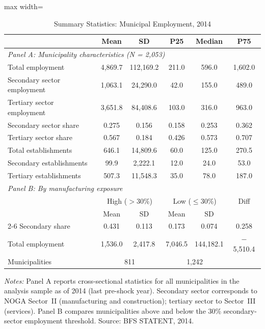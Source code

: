 \begin{table}[htbp]
\centering
\caption{Summary Statistics: Municipal Employment, 2014}
\label{tab:summary}
\begin{threeparttable}
\begin{adjustbox}{max width=\textwidth}
\begin{tabular}{lccccc}
\hline\hline
 & Mean & SD & P25 & Median & P75 \\
\hline
\multicolumn{6}{l}{\textit{Panel A: Municipality characteristics (N = 2,053)}} \\[3pt]
Total employment & 4,869.7 & 112,169.2 & 211.0 & 596.0 & 1,602.0 \\
Secondary sector employment & 1,063.1 & 24,290.0 & 42.0 & 155.0 & 489.0 \\
Tertiary sector employment & 3,651.8 & 84,408.6 & 103.0 & 316.0 & 963.0 \\
Secondary sector share & 0.275 & 0.156 & 0.158 & 0.253 & 0.362 \\
Tertiary sector share & 0.567 & 0.184 & 0.426 & 0.573 & 0.707 \\
Total establishments & 646.1 & 14,809.6 & 60.0 & 125.0 & 270.5 \\
Secondary establishments & 99.9 & 2,222.1 & 12.0 & 24.0 & 53.0 \\
Tertiary establishments & 507.3 & 11,548.3 & 35.0 & 78.0 & 187.0 \\[6pt]
\multicolumn{6}{l}{\textit{Panel B: By manufacturing exposure}} \\[3pt]
 & \multicolumn{2}{c}{High ($>$30\%)} & \multicolumn{2}{c}{Low ($\leq$30\%)} & Diff \\
 & Mean & SD & Mean & SD & \\
\cline{2-6}
Secondary share & 0.431 & 0.113 & 0.173 & 0.074 & 0.258 \\
Total employment & 1,536.0 & 2,417.8 & 7,046.5 & 144,182.1 & $-$5,510.4 \\
Municipalities & \multicolumn{2}{c}{811} & \multicolumn{2}{c}{1,242} & \\
\hline\hline
\end{tabular}
\end{adjustbox}
\begin{tablenotes}[flushleft]\small
\item \textit{Notes:} Panel A reports cross-sectional statistics for all municipalities in the analysis sample as of 2014 (last pre-shock year). Secondary sector corresponds to NOGA Sector~II (manufacturing and construction); tertiary sector to Sector~III (services). Panel B compares municipalities above and below the 30\% secondary-sector employment threshold. Source: BFS STATENT, 2014.
\end{tablenotes}
\end{threeparttable}
\end{table}
